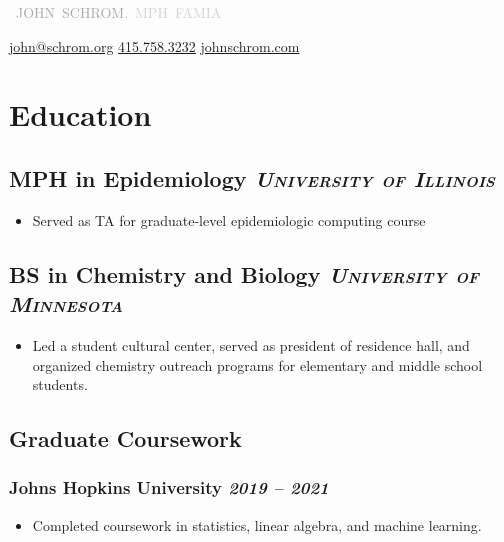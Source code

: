 \documentclass[11pt]{article}
\newcommand{\rside}[1]{
  \hfill {\itshape #1}%
}
\begin{document}

\begin{center}
  {
    \mbox{
    \fontsize{30}{12}\selectfont\textcolor{darkgray}{JOHN SCHROM}\normalfont\selectfont\textcolor{lightgray}{, MPH FAMIA}
    }
  } \\ \medskip

  \href{mailto:john@schrom.org}{john@schrom.org} \quad \textbullet \quad
  \href{tel:4157583232}{415.758.3232} \quad \textbullet \quad
  \href{https://johnschrom.com}{johnschrom.com}

\end{center}


\section{Education}
\subsection{MPH in Epidemiology \rside{\normalfont\large\bfseries\scshape{University of Illinois}}}
\begin{itemize}[label=-]
    \item Served as TA for graduate-level epidemiologic computing course
\end{itemize}
\subsection{BS in Chemistry and Biology \rside{\normalfont\large\bfseries\scshape{University of Minnesota}}}
\begin{itemize}[label=-]
    \item Led a student cultural center, served as president of residence hall, and organized chemistry outreach programs for elementary and middle school students.
\end{itemize}
\subsection{Graduate Coursework}
\subsubsection{Johns Hopkins University \rside{2019 -- 2021}}
\begin{itemize}[label=-]
    \item Completed coursework in statistics, linear algebra, and machine learning.
\end{itemize}
\end{document}
